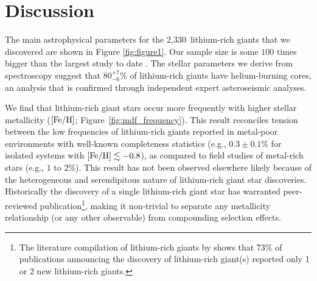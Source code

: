 \documentclass[twocolumn]{aastex62}
\newcommand{\SampleSize}{2,330}
\begin{document}
\section{Discussion} \label{sec:discussion}

The main astrophysical parameters for the \SampleSize\ lithium-rich giants
that we discovered are shown in Figure \ref{fig:figure1}.  Our sample size
is some $100$ times bigger than the largest study to date \citep{Martell_2013}.
The stellar parameters we derive from spectroscopy suggest that $80^{+7}_{-6}$\% of lithium-rich 
giants have helium-burning cores, an analysis that is confirmed through independent expert
asteroseismic analyses. 


We find that lithium-rich giant stars occur more frequently with higher stellar 
metallicity ($[{\rm Fe/H}]$; Figure~\ref{fig:mdf_frequency}). This result 
reconciles tension between the low frequencies of lithium-rich giants reported 
in metal-poor environments with well-known completeness statistics \citep{Kirby_2016} 
(e.g., $0.3 \pm 0.1$\% for isolated systems with $[{\rm Fe/H}] \lesssim -0.8$), 
as compared to field studies of metal-rich stars \citep{Brown_1989} (e.g., $1$ to $2$\%). 
This result has not been observed elsewhere likely because of the heterogeneous and 
serendipitous nature of lithium-rich giant star discoveries. Historically the 
discovery of a single lithium-rich giant star has warranted peer-reviewed 
publication\footnote{The literature compilation of lithium-rich giants by \citet{Casey_2016} shows that 73\% of publications announcing the discovery of lithium-rich giant(s) reported only 1 or 2 new lithium-rich giants.}, making it non-trivial to separate any metallicity 
relationship (or any other observable) from compounding selection effects.
\end{document}
